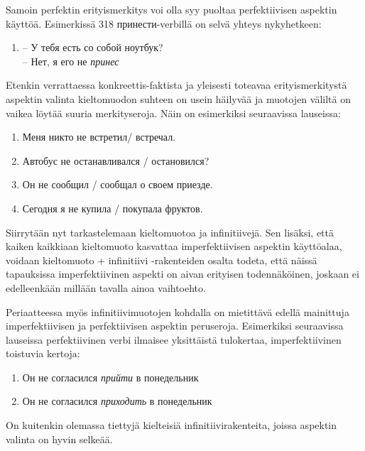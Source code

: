 \documentclass[]{scrartcl}
\providecommand{\tightlist}{%
  \setlength{\itemsep}{0pt}\setlength{\parskip}{0pt}}
\begin{document}
Samoin perfektin erityismerkitys voi olla syy puoltaa perfektiivisen
aspektin käyttöä. Esimerkissä 318 принести-verbillä on selvä yhteys
nykyhetkeen:

\begin{enumerate}
\def\labelenumi{(\arabic{enumi})}
\setcounter{enumi}{317}
\tightlist
\item
  -- У тебя есть со собой ноутбук?\\
   -- Нет, я его не \emph{принес}
\end{enumerate}

Etenkin verrattaessa konkreettis-faktista ja yleisesti toteavaa
erityismerkitystä aspektin valinta kieltomuodon suhteen on usein
häilyvää ja muotojen väliltä on vaikea löytää suuria merkityseroja. Näin
on esimerkiksi seuraavissa lauseissa:

\begin{enumerate}
\def\labelenumi{(\arabic{enumi})}
\setcounter{enumi}{318}
\tightlist
\item
  Меня никто не встретил/ встречал.
\item
  Автобус не останавливался / остановился?
\item
  Он не сообщил / сообщал о своем приезде.
\item
  Сегодня я не купила / покупала фруктов.
\end{enumerate}

Siirrytään nyt tarkastelemaan kieltomuotoa ja infinitiivejä. Sen
lisäksi, että kaiken kaikkiaan kieltomuoto kasvattaa imperfektiivisen
aspektin käyttöalaa, voidaan kieltomuoto + infinitiivi -rakenteiden
osalta todeta, että näissä tapauksissa imperfektiivinen aspekti on aivan
erityisen todennäköinen, joskaan ei edelleenkään millään tavalla ainoa
vaihtoehto.

Periaatteessa myös infinitiivimuotojen kohdalla on mietittävä edellä
mainittuja imperfektiivisen ja perfektiivisen aspektin peruseroja.
Esimerkiksi seuraavissa lauseissa perfektiivinen verbi ilmaisee
yksittäistä tulokertaa, imperfektiivinen toistuvia kertoja:

\begin{enumerate}
\def\labelenumi{(\arabic{enumi})}
\setcounter{enumi}{322}
\tightlist
\item
  Он не согласился \emph{прийти} в понедельник
\item
  Он не согласился \emph{приходить} в понедельник
\end{enumerate}

On kuitenkin olemassa tiettyjä kielteisiä infinitiivirakenteita, joissa
aspektin valinta on hyvin selkeää.
\end{document}
